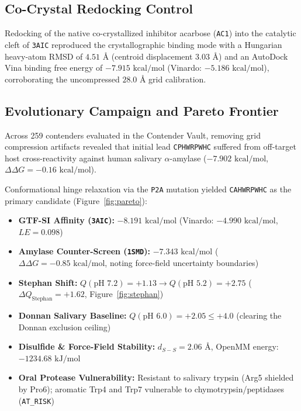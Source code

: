 \documentclass[11pt,a4paper]{article}
\begin{document}
\subsection{Co-Crystal Redocking Control}
Redocking of the native co-crystallized inhibitor acarbose (\texttt{AC1}) into the catalytic cleft of \texttt{3AIC} reproduced the crystallographic binding mode with a Hungarian heavy-atom RMSD of $4.51\text{ \AA}$ (centroid displacement $3.03\text{ \AA}$) and an AutoDock Vina binding free energy of $-7.915\text{ kcal/mol}$ (Vinardo: $-5.186\text{ kcal/mol}$), corroborating the uncompressed $28.0\text{ \AA}$ grid calibration.

\subsection{Evolutionary Campaign and Pareto Frontier}
Across 259 contenders evaluated in the Contender Vault, removing grid compression artifacts revealed that initial lead \texttt{CPHWRPWHC} suffered from off-target host cross-reactivity against human salivary $\alpha$-amylase ($-7.902\text{ kcal/mol}$, $\Delta\Delta G = -0.16\text{ kcal/mol}$). 

Conformational hinge relaxation via the \texttt{P2A} mutation yielded \texttt{CAHWRPWHC} as the primary candidate (Figure~\ref{fig:pareto}):
\begin{itemize}
    \item \textbf{GTF-SI Affinity (\texttt{3AIC}):} $-8.191\text{ kcal/mol}$ (Vinardo: $-4.990\text{ kcal/mol}$, $LE = 0.098$)
    \item \textbf{Amylase Counter-Screen (\texttt{1SMD}):} $-7.343\text{ kcal/mol}$ ($\Delta\Delta G = -0.85\text{ kcal/mol}$, noting force-field uncertainty boundaries)
    \item \textbf{Stephan Shift:} $Q(\text{pH } 7.2) = +1.13 \rightarrow Q(\text{pH } 5.2) = +2.75$ ($\Delta Q_{\text{Stephan}} = +1.62$, Figure~\ref{fig:stephan})
    \item \textbf{Donnan Salivary Baseline:} $Q(\text{pH } 6.0) = +2.05 \le +4.0$ (clearing the Donnan exclusion ceiling)
    \item \textbf{Disulfide \& Force-Field Stability:} $d_{S-S} = 2.06\text{ \AA}$, OpenMM energy: $-1234.68\text{ kJ/mol}$
    \item \textbf{Oral Protease Vulnerability:} Resistant to salivary trypsin (Arg5 shielded by Pro6); aromatic Trp4 and Trp7 vulnerable to chymotrypsin/peptidases (\texttt{AT\_RISK})
\end{itemize}
\end{document}
